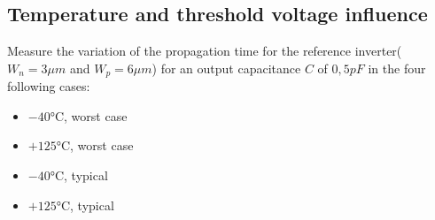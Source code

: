 \documentclass[../main.tex]{subfiles}
\begin{document}
	\subsection{Temperature and threshold voltage influence}
	{
		\begin{tcolorbox}[colback=gray!5!white,colframe=gray!75!black]
			Measure the variation of the propagation time for the reference inverter($W_n = 3\mu m$ and $W_p = 6\mu m$) for an output capacitance $C$ of $0,5pF$ in the four following cases:
			\begin{itemize}
				\item $-40$°C, worst case
				\item $+125$°C, worst case
				\item $-40$°C, typical
				\item $+125$°C, typical
			\end{itemize}
		\end{tcolorbox}
		
}
\end{document}
